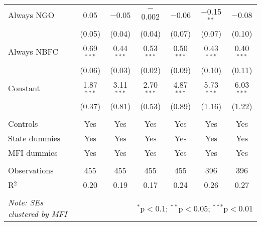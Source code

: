 \documentclass[11pt]{article}
\begin{document}
\begin{table}[!htbp]
\begin{tabular}{p{7cm}cccccc}
  Always NGO & 0.05 & $-$0.05 & $-$0.002 & $-$0.06 & $-$0.15$^{**}$ & $-$0.08 \\ 
  & (0.05) & (0.04) & (0.04) & (0.07) & (0.07) & (0.10) \\ 
  Always NBFC & 0.69$^{***}$ & 0.44$^{***}$ & 0.53$^{***}$ & 0.50$^{***}$ & 0.43$^{***}$ & 0.40$^{***}$ \\ 
  & (0.06) & (0.03) & (0.02) & (0.09) & (0.10) & (0.11) \\ 
  Constant & 1.87$^{***}$ & 3.11$^{***}$ & 2.70$^{***}$ & 4.87$^{***}$ & 5.73$^{***}$ & 6.03$^{***}$ \\ 
  & (0.37) & (0.81) & (0.53) & (0.89) & (1.16) & (1.22) \\ 
 \hline \\[-1.8ex] 
Controls & Yes & Yes & Yes & Yes & Yes & Yes \\ 
State dummies & Yes & Yes & Yes & Yes & Yes & Yes \\ 
MFI dummies & Yes & Yes & Yes & Yes & Yes & Yes \\ 
\hline \\[-1.8ex] 
Observations & 455 & 455 & 455 & 455 & 396 & 396 \\ 
R$^{2}$ & 0.20 & 0.19 & 0.17 & 0.24 & 0.26 & 0.27 \\ 
\hline 
\hline \\[-1.8ex] 
\textit{Note: SEs clustered by MFI}  & \multicolumn{6}{r}{$^{*}$p$<$0.1; $^{**}$p$<$0.05; $^{***}$p$<$0.01} \\ 
\end{tabular} 
\end{table} 
\end{document}
